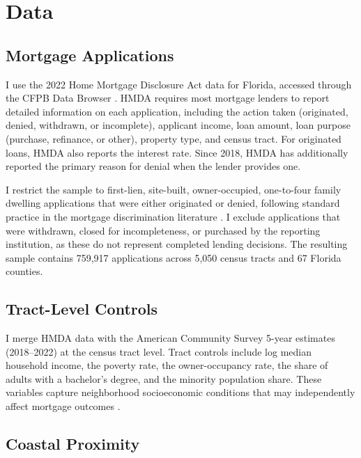 \documentclass[12pt]{article}
\begin{document}
\section{Data}
\label{sec:data}

\subsection{Mortgage Applications}

I use the 2022 Home Mortgage Disclosure Act data for Florida, accessed through the CFPB Data Browser \citep{cfpb2023hmda}. HMDA requires most mortgage lenders to report detailed information on each application, including the action taken (originated, denied, withdrawn, or incomplete), applicant income, loan amount, loan purpose (purchase, refinance, or other), property type, and census tract. For originated loans, HMDA also reports the interest rate. Since 2018, HMDA has additionally reported the primary reason for denial when the lender provides one.

I restrict the sample to first-lien, site-built, owner-occupied, one-to-four family dwelling applications that were either originated or denied, following standard practice in the mortgage discrimination literature \citep{munnell1996mortgage, bhutta2021minorities}. I exclude applications that were withdrawn, closed for incompleteness, or purchased by the reporting institution, as these do not represent completed lending decisions. The resulting sample contains 759,917 applications across 5,050 census tracts and 67 Florida counties.

\subsection{Tract-Level Controls}

I merge HMDA data with the American Community Survey 5-year estimates (2018--2022) at the census tract level. Tract controls include log median household income, the poverty rate, the owner-occupancy rate, the share of adults with a bachelor's degree, and the minority population share. These variables capture neighborhood socioeconomic conditions that may independently affect mortgage outcomes \citep{ross2002color, dellariccia2012credit}.

\subsection{Coastal Proximity}
\end{document}

